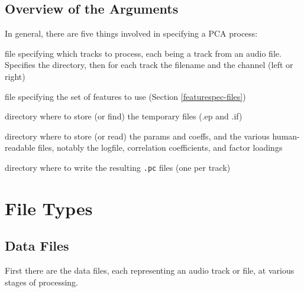 \documentclass[11pt]{article}
\begin{document}
\subsection{Overview of the Arguments} 

In general, there are five things involved in specifying a PCA process:

\begin{description}  \setlength{\itemsep}{0pt}\setlength{\parskip}{0pt}
\item[tracklist] file specifying which tracks to process, each being a
  track from an audio file.  Specifies the directory, then for each
  track the filename and the channel (left or right)
\item[featurespec file] file specifying the set of features to use (Section \ref{featurespec-files})
\item[feature dir] directory where to store (or find) the temporary
  files (.ep and .if) 
\item[parameter dir] directory where to store (or read) the params and
  coeffs, and the various human-readable files, notably the logfile,
  correlation coefficients, and factor loadings
\item[output dir] directory where to write the resulting {\tt .pc} files (one per track)
\end{description}


\section{File Types}       

\subsection{Data Files}

First there are the data files, each representing an audio track or
file, at various stages of processing.
\end{document}
